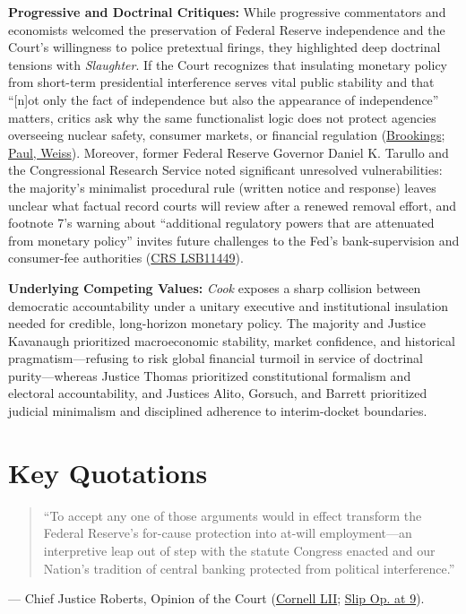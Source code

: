 \documentclass[12pt]{article}
\begin{document}
\textbf{Progressive and Doctrinal Critiques:} While progressive commentators and economists welcomed the preservation of Federal Reserve independence and the Court's willingness to police pretextual firings, they highlighted deep doctrinal tensions with \textit{Slaughter}. If the Court recognizes that insulating monetary policy from short-term presidential interference serves vital public stability and that ``[n]ot only the fact of independence but also the appearance of independence'' matters, critics ask why the same functionalist logic does not protect agencies overseeing nuclear safety, consumer markets, or financial regulation (\href{https://www.brookings.edu/articles/fed-independence-after-trump-v-cook/}{Brookings}; \href{https://www.paulweiss.com/insights/client-memos/supreme-court-overrules-humphrey-s-executor-but-preserves-the-fed-s-independence}{Paul, Weiss}). Moreover, former Federal Reserve Governor Daniel K. Tarullo and the Congressional Research Service noted significant unresolved vulnerabilities: the majority's minimalist procedural rule (written notice and response) leaves unclear what factual record courts will review after a renewed removal effort, and footnote 7's warning about ``additional regulatory powers that are attenuated from monetary policy'' invites future challenges to the Fed's bank-supervision and consumer-fee authorities (\href{https://www.everycrsreport.com/reports/LSB11449.html}{CRS LSB11449}).

\textbf{Underlying Competing Values:} \textit{Cook} exposes a sharp collision between democratic accountability under a unitary executive and institutional insulation needed for credible, long-horizon monetary policy. The majority and Justice Kavanaugh prioritized macroeconomic stability, market confidence, and historical pragmatism---refusing to risk global financial turmoil in service of doctrinal purity---whereas Justice Thomas prioritized constitutional formalism and electoral accountability, and Justices Alito, Gorsuch, and Barrett prioritized judicial minimalism and disciplined adherence to interim-docket boundaries.

\section{Key Quotations}

\begin{quote}
``To accept any one of those arguments would in effect transform the Federal Reserve's for-cause protection into at-will employment---an interpretive leap out of step with the statute Congress enacted and our Nation's tradition of central banking protected from political interference.''
\end{quote}
\noindent --- Chief Justice Roberts, Opinion of the Court (\href{https://www.law.cornell.edu/supremecourt/text/25A312}{Cornell LII}; \href{https://www.supremecourt.gov/opinions/25pdf/25a312_5468.pdf}{Slip Op. at 9}).
\end{document}
